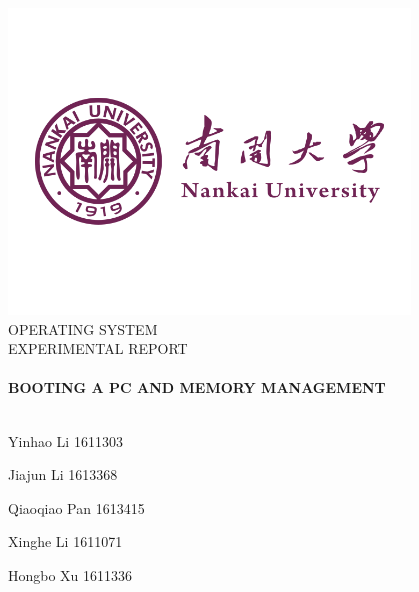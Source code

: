 \begin{titlepage}

\begin{center}


\includegraphics[width=0.8\textwidth]{figure/logoNankai}\\[1cm]

\textsc{\LARGE OPERATING SYSTEM }\\[1.5cm]

\textsc{\LARGE EXPERIMENTAL REPORT }\\[0.5cm]


\HRule \\[0.8cm]
{\huge \bfseries BOOTING A PC AND MEMORY MANAGEMENT}\\[0.4cm]

\HRule \\[3.0cm]

\begin{minipage}{0.4\textwidth}
\begin{center}
Yinhao Li 1611303

Jiajun Li 1613368

Qiaoqiao Pan 1613415

Xinghe Li 1611071

Hongbo Xu 1611336
\end{center}
\end{minipage}

\vfill



\end{center}

\end{titlepage}



